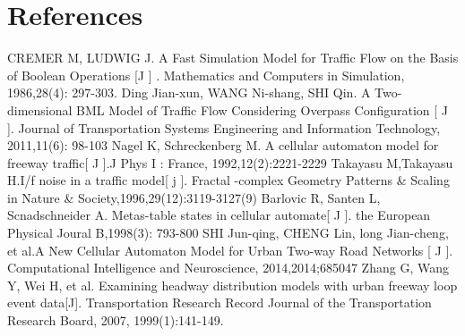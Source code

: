 \documentclass[UTF8]{mcmthesis}
\begin{document}
\section{References}
\begin{thebibliography}{99}
CREMER M, LUDWIG J. A Fast Simulation Model for Traffic Flow on the Basis of Boolean Operations [J ] . Mathematics and Computers in Simulation, 1986,28(4): 297-303.
Ding Jian-xun, WANG Ni-shang, SHI Qin. A Two-dimensional BML Model of Traffic Flow Considering Overpass Configuration [ J ]. Journal of Transportation Systems Engineering and Information Technology, 2011,11(6): 98-103
Nagel K, Schreckenberg M. A cellular automaton model for freeway traffic[ J ].J Phys I : France, 1992,12(2):2221-2229
Takayasu M,Takayasu H.I/f  noise in a traffic model[ j ]. Fractal -complex Geometry Patterns \& Scaling in Nature \& Society,1996,29(12):3119-3127(9)
Barlovic R, Santen L, Scnadschneider A. Metas-table states in cellular automate[ J ]. the European Physical Joural B,1998(3): 793-800
SHI Jun-qing, CHENG Lin, long Jian-cheng, et al.A New Cellular Automaton Model for Urban Two-way Road Networks [ J ]. Computational Intelligence and Neuroscience, 2014,2014;685047
Zhang G, Wang Y, Wei H, et al. Examining headway distribution models with urban freeway loop event data[J]. Transportation Research Record Journal of the Transportation Research Board, 2007, 1999(1):141-149.
\end{thebibliography}
\end{document}
